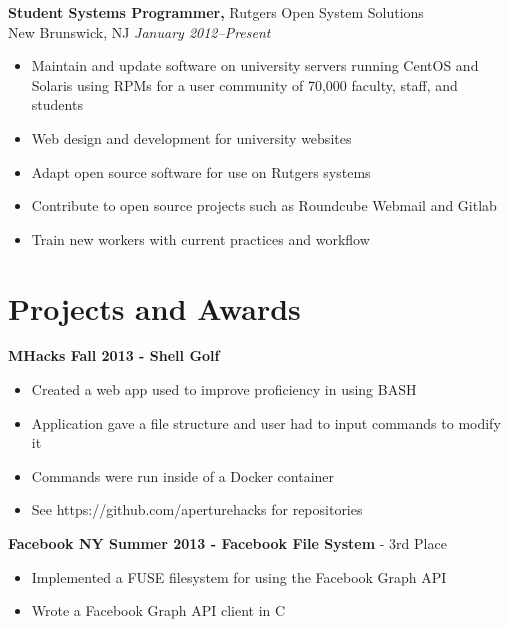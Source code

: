 \documentclass[margin]{res}
\begin{document}
\begin{resume}
{\bf Student Systems Programmer,} Rutgers Open System Solutions\\
New Brunswick, NJ \textit{January 2012--Present}
\begin{itemize} \itemsep -2pt %
	\item Maintain and update software on university servers running CentOS and Solaris using RPMs for a user community of 70,000 faculty, staff, and students
	\item Web design and development for university websites
	\item Adapt open source software for use on Rutgers systems
	\item Contribute to open source projects such as Roundcube Webmail and
    Gitlab
	\item Train new workers with current practices and workflow
\end{itemize}


\section{Projects and Awards} 

    {\bf MHacks Fall 2013 - Shell Golf}
    \begin{itemize} \itemsep -2pt
        \item Created a web app used to improve proficiency in using BASH
        \item Application gave a file structure and user had to input commands
        to modify it
        \item Commands were run inside of a Docker container
        \item See https://github.com/aperturehacks for repositories
    \end{itemize}

    {\bf Facebook NY Summer 2013 - Facebook File System} - 3rd
    Place
    \begin{itemize} \itemsep -2pt
        \item Implemented a FUSE filesystem for using the Facebook Graph API
        \item Wrote a Facebook Graph API client in C
    \end{itemize}


\end{resume}
\end{document}
